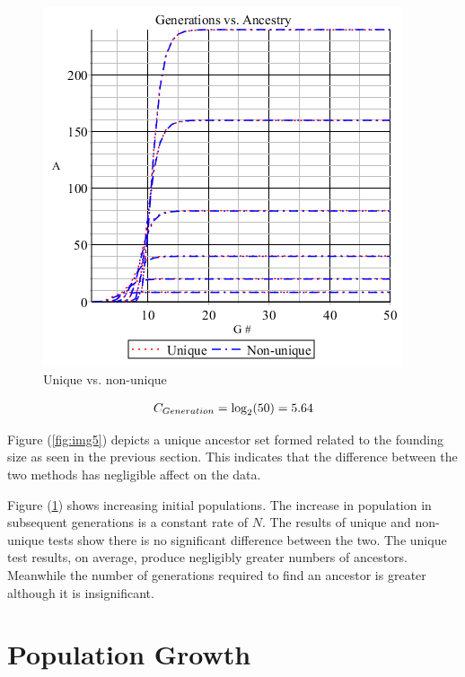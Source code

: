 \documentclass[12pt]{extarticle}
\begin{document}
\begin{figure}
	\includegraphics[scale=0.50]{Graph6.png}
	\caption{Unique vs. non-unique}
	\label{fig:img6}
\end{figure}
\begin{align}
\notag
C_{Generation} = \log_2(50) = 5.64
\end{align}

Figure (\ref{fig:img5}) depicts a unique ancestor set formed related to the founding size as seen in the previous section. This indicates that the difference between the two methods has negligible affect on the data.

Figure (\ref{fig:img6}) shows increasing initial populations. The increase in population in subsequent generations is a constant rate of $N$. The results of unique and non-unique tests show there is no significant difference between the two. The unique test results, on average, produce negligibly greater numbers of ancestors. Meanwhile the number of generations required to find an ancestor is greater although it is insignificant.

\section{Population Growth}
\end{document}
